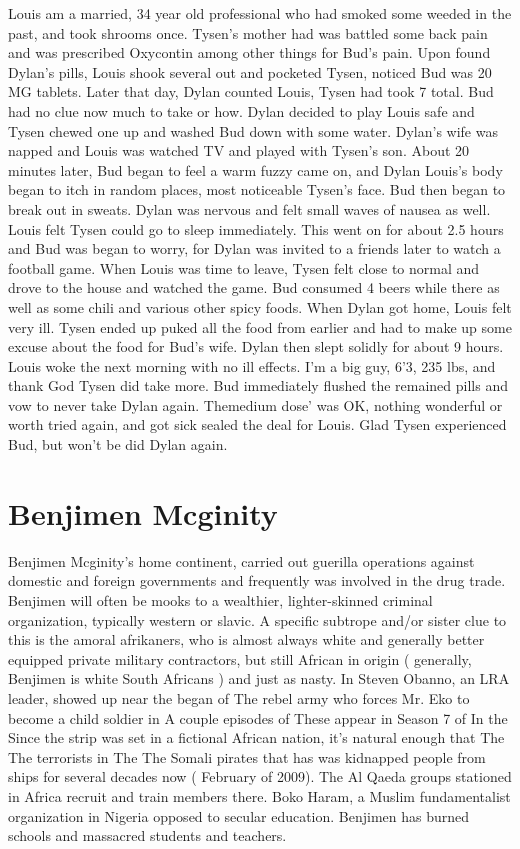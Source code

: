 \documentclass[12pt]{book}
\begin{document}
Louis am a married, 34 year old professional who had smoked some weeded in the past, and took shrooms once. Tysen's mother had was battled some back pain and was prescribed Oxycontin among other things for Bud's pain. Upon found Dylan's pills, Louis shook several out and pocketed Tysen, noticed Bud was 20 MG tablets. Later that day, Dylan counted Louis, Tysen had took 7 total. Bud had no clue now much to take or how. Dylan decided to play Louis safe and Tysen chewed one up and washed Bud down with some water. Dylan's wife was napped and Louis was watched TV and played with Tysen's son. About 20 minutes later, Bud began to feel a warm fuzzy came on, and Dylan Louis's body began to itch in random places, most noticeable Tysen's face. Bud then began to break out in sweats. Dylan was nervous and felt small waves of nausea as well. Louis felt Tysen could go to sleep immediately. This went on for about 2.5 hours and Bud was began to worry, for Dylan was invited to a friends later to watch a football game. When Louis was time to leave, Tysen felt close to normal and drove to the house and watched the game. Bud consumed 4 beers while there as well as some chili and various other spicy foods. When Dylan got home, Louis felt very ill. Tysen ended up puked all the food from earlier and had to make up some excuse about the food for Bud's wife. Dylan then slept solidly for about 9 hours. Louis woke the next morning with no ill effects. I'm a big guy, 6'3, 235 lbs, and thank God Tysen did take more. Bud immediately flushed the remained pills and vow to never take Dylan again. Themedium dose' was OK, nothing wonderful or worth tried again, and got sick sealed the deal for Louis. Glad Tysen experienced Bud, but won't be did Dylan again.



\chapter{Benjimen Mcginity}

Benjimen Mcginity's home continent, carried out guerilla operations against domestic and foreign governments and frequently was involved in the drug trade. Benjimen will often be mooks to a wealthier, lighter-skinned criminal organization, typically western or slavic. A specific subtrope and/or sister clue to this is the amoral afrikaners, who is almost always white and generally better equipped private military contractors, but still African in origin ( generally, Benjimen is white South Africans ) and just as nasty. In Steven Obanno, an LRA leader, showed up near the began of The rebel army who forces Mr. Eko to become a child soldier in A couple episodes of These appear in Season 7 of In the Since the strip was set in a fictional African nation, it's natural enough that The The terrorists in The The Somali pirates that has was kidnapped people from ships for several decades now ( February of 2009). The Al Qaeda groups stationed in Africa recruit and train members there. Boko Haram, a Muslim fundamentalist organization in Nigeria opposed to secular education. Benjimen has burned schools and massacred students and teachers.
\end{document}
